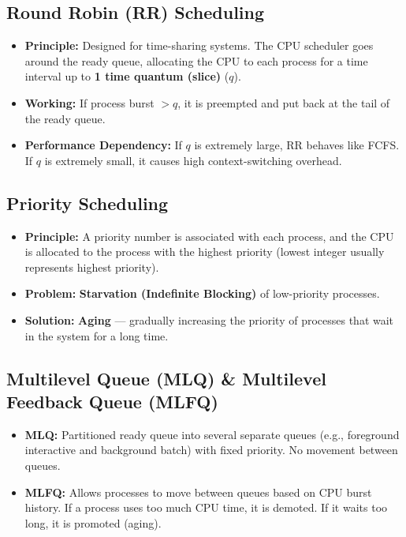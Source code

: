 \documentclass[12pt,a4paper]{article}
\begin{document}
\subsection{Round Robin (RR) Scheduling}
\begin{itemize}[leftmargin=*, itemsep=3pt]
  \item \textbf{Principle:} Designed for time-sharing systems. The CPU scheduler goes around the ready queue, allocating the CPU to each process for a time interval up to \textbf{1 time quantum (slice)} ($q$).
  \item \textbf{Working:} If process burst $> q$, it is preempted and put back at the tail of the ready queue.
  \item \textbf{Performance Dependency:} If $q$ is extremely large, RR behaves like FCFS. If $q$ is extremely small, it causes high context-switching overhead.
\end{itemize}

\subsection{Priority Scheduling}
\begin{itemize}[leftmargin=*, itemsep=3pt]
  \item \textbf{Principle:} A priority number is associated with each process, and the CPU is allocated to the process with the highest priority (lowest integer usually represents highest priority).
  \item \textbf{Problem:} \textbf{Starvation (Indefinite Blocking)} of low-priority processes.
  \item \textbf{Solution:} \textbf{Aging} --- gradually increasing the priority of processes that wait in the system for a long time.
\end{itemize}

\subsection{Multilevel Queue (MLQ) \& Multilevel Feedback Queue (MLFQ)}
\begin{itemize}[leftmargin=*, itemsep=3pt]
  \item \textbf{MLQ:} Partitioned ready queue into several separate queues (e.g., foreground interactive and background batch) with fixed priority. No movement between queues.
  \item \textbf{MLFQ:} Allows processes to move between queues based on CPU burst history. If a process uses too much CPU time, it is demoted. If it waits too long, it is promoted (aging).
\end{itemize}
\end{document}
